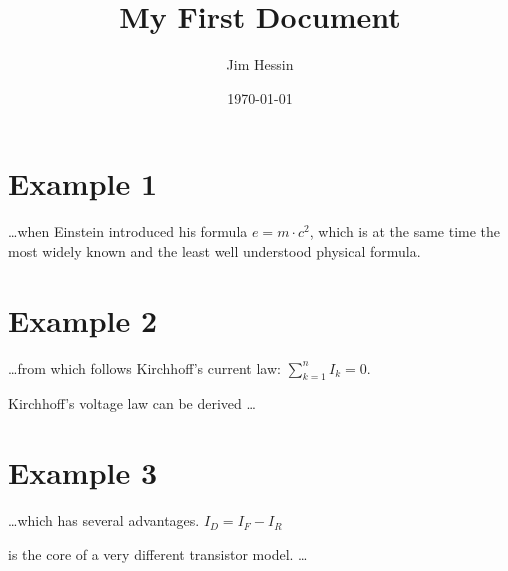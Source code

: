 \documentclass[a4paper]{article}
\title{My First Document}
\date{\today}
\author{Jim Hessin}
\begin{document}
\maketitle
\newpage
\tableofcontents
\newpage

\section{Example 1}
\ldots when Einstein introduced his formula
$e = m \cdot c^2$,
which is at the same time the most widely known
and the least well understood physical formula.

\section{Example 2}
\ldots from which follows Kirchhoff's current law:
$\sum_{k=1}^{n} I_k = 0$.

Kirchhoff's voltage law can be derived \ldots

\section{Example 3}
\ldots which has several advantages.
$I_D = I_F - I_R$

is the core of a very different transistor model.
\ldots
\end{document}

